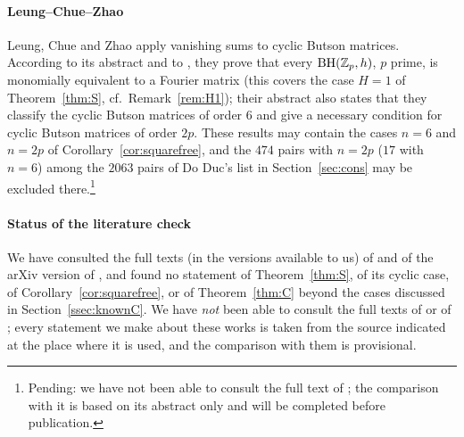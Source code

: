 \paragraph{Leung--Chue--Zhao}
Leung, Chue and Zhao \cite{LeungChueZhao2025} apply vanishing sums to
cyclic Butson matrices. According to its abstract and to
\cite[Sect.~1]{OngSchmidt2026}, they prove that every $\operatorname{BH}(\mathbb{Z}_p,h)$, $p$
prime, is monomially equivalent to a Fourier matrix (this covers the case
$H=1$ of Theorem~\ref{thm:S}, cf.\ Remark~\ref{rem:H1}); their abstract
also states that they classify the cyclic Butson matrices of order $6$
and give a necessary condition for cyclic Butson matrices of order $2p$.
These results may contain the cases $n=6$ and $n=2p$ of
Corollary~\ref{cor:squarefree}, and the $474$ pairs with $n=2p$
($17$ with $n=6$) among the $2063$ pairs of Do Duc's list in
Section~\ref{sec:cons} may be excluded there.\footnote{Pending: we have
not been able to consult the full text of \cite{LeungChueZhao2025}; the
comparison with it is based on its abstract only and will be completed
before publication.}

\paragraph{Status of the literature check}
We have consulted the full texts (in the versions available to us) of
\cite{DoDuc2019,DoDuc2019b,DucSchmidt2019,LeungSchmidtZhang2023,Lv2017,
Feng2009,Yayla2016,WinterhofYaylaZiegler2014,Arasu2011,
HiranandaniSchlenker2016,LeungSchmidt2005,LeungSchmidt2012,
LeungSchmidt2019,Arxiv260724103,OngSchmidt2026,MaSchmidt1995} and of the arXiv version
of \cite{Schmidt2016survey}, and found no statement of
Theorem~\ref{thm:S}, of its cyclic case, of
Corollary~\ref{cor:squarefree}, or of Theorem~\ref{thm:C} beyond the
cases discussed in Section~\ref{ssec:knownC}. We have \emph{not} been able to consult
the full texts of
\cite{ArasuDeLauneyMa2002,Ma1996,MaNg2009,LeungChueZhao2025,Pott1995,
Schmidt2002LNM,DeLauneyFlannery2011,Mow1995} or of
\cite{Pei1993,Ikeda1999,Feng2001,LiuMaFeng2002,FengLiu2003b}; every
statement we make about these works is taken from the source indicated
at the place where it is used, and the comparison with them is
provisional.
